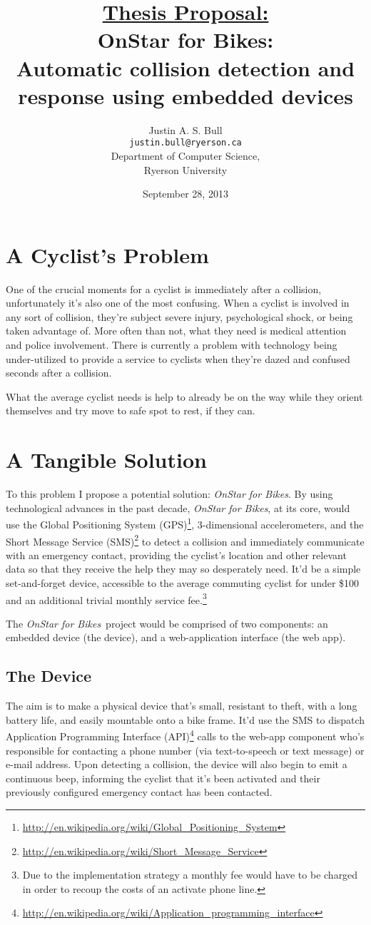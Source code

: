 \documentclass[titlepage]{article}
\title{\underline{Thesis Proposal:}\\
	\vspace{12pt}
	OnStar for Bikes:\\
	Automatic collision detection and response using embedded devices}
\author{Justin A. S. Bull\\
	\texttt{justin.bull@ryerson.ca}\\
	Department of Computer Science,\\
	Ryerson University\\}
\date{September 28, 2013}
\newcommand{\onstar}{{\em OnStar for Bikes}}
\begin{document}
\maketitle

\section{A Cyclist's Problem}
One of the crucial moments for a cyclist is immediately after a collision, unfortunately it's also one of the most confusing. When a cyclist is involved in any sort of collision, they're subject severe injury, psychological shock, or being taken advantage of. More often than not, what they need is medical attention and police involvement. There is currently a problem with technology being under-utilized to provide a service to cyclists when they're dazed and confused seconds after a collision.

What the average cyclist needs is help to already be on the way while they orient themselves and try move to safe spot to rest, if they can.

\section{A Tangible Solution}
To this problem I propose a potential solution: \onstar. By using technological advances in the past decade, \onstar, at its core, would use the Global Positioning System (GPS)\footnote{\url{http://en.wikipedia.org/wiki/Global_Positioning_System}}, 3-dimensional accelerometers, and the Short Message Service (SMS)\footnote{\url{http://en.wikipedia.org/wiki/Short_Message_Service}} to detect a collision and immediately communicate with an emergency contact, providing the cyclist's location and other relevant data so that they receive the help they may so desperately need. It'd be a simple set-and-forget device, accessible to the average commuting cyclist for under \$100 and an additional trivial monthly service fee.\footnote{Due to the implementation strategy a monthly fee would have to be charged in order to recoup the costs of an activate phone line.}

The \onstar\ project would be comprised of two components: an embedded device (the device), and a web-application interface (the web app).

\subsection{The Device}
The aim is to make a physical device that's small, resistant to theft, with a long battery life, and easily mountable onto a bike frame. It'd use the SMS to dispatch Application Programming Interface (API)\footnote{\url{http://en.wikipedia.org/wiki/Application_programming_interface}} calls to the web-app component who's responsible for contacting a phone number (via text-to-speech or text message) or e-mail address. Upon detecting a collision, the device will also begin to emit a continuous beep, informing the cyclist that it's been activated and their previously configured emergency contact has been contacted.
\end{document}
